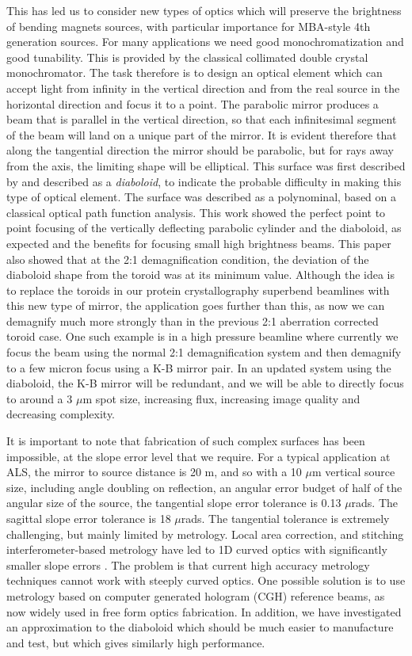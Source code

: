 \documentclass{iucr}              %
\newcommand{\inred}[1]{{\color{red}#1}}
\begin{document}
This has led us to consider new types of optics which will preserve the brightness of bending magnets sources, with particular importance for MBA-style 4th generation sources.   
For many applications we need good monochromatization and good tunability.  This is provided by the classical collimated double crystal monochromator.  The task therefore is to design an optical element which can accept light from infinity in the vertical direction and from the real source in the horizontal direction and focus it to a point.  The parabolic mirror produces a beam that is parallel in the vertical direction, so that each infinitesimal segment of the beam will land on a unique part of the mirror.  It is evident therefore that along the tangential direction the mirror should be parabolic, but for rays away from the axis, the limiting shape will be elliptical. 
\inred{This surface was first described by \cite{McKinneySPIE2009} and described as a {\it diaboloid}, to indicate the probable difficulty in making this type of optical element.  The surface was described as a polynominal, based on a classical optical path function analysis.  This work showed the perfect point to point focusing of the vertically deflecting parabolic cylinder and the diaboloid, as expected and the benefits for focusing small high brightness beams.  This paper also showed that at the 2:1 demagnification condition, the deviation of the diaboloid shape from the toroid was at its minimum value.} Although the idea is to replace the toroids in our protein crystallography superbend beamlines with this new type of mirror, the application goes further than this, as now we can demagnify much more strongly than in the previous 2:1 aberration corrected toroid case.  One such example is in a high pressure beamline where currently we focus the beam using the normal 2:1 demagnification system and then demagnify to a few micron focus using a K-B mirror pair.  In an updated system using the diaboloid, the K-B mirror will be redundant, and we will be able to directly focus to around a 3 $\mu$m spot size, increasing flux, increasing image quality and decreasing complexity.

It is important to note that fabrication of such complex surfaces has been impossible, at the slope error level that we require.  For a typical application at ALS, the mirror to source distance is 20 m, and so with a 10 $\mu$m vertical source size, including angle doubling on reflection, an angular error budget of half of the angular size of the source, the tangential slope error tolerance is 0.13 $\mu$rads.  The sagittal slope error tolerance is 18 $\mu$rads.  The tangential tolerance is extremely challenging, but mainly limited by metrology.  Local area correction, and stitching interferometer-based metrology have led to 1D curved optics with significantly smaller slope errors \cite{Yamauchi2002}.  The problem is that current high accuracy metrology techniques cannot work with steeply curved optics.  One possible solution is to use metrology based on computer generated hologram (CGH) reference beams, as now widely used in free form optics fabrication. In addition, we have investigated an approximation to the diaboloid which should be much easier to manufacture and test, but which gives similarly high performance. 
\end{document}
